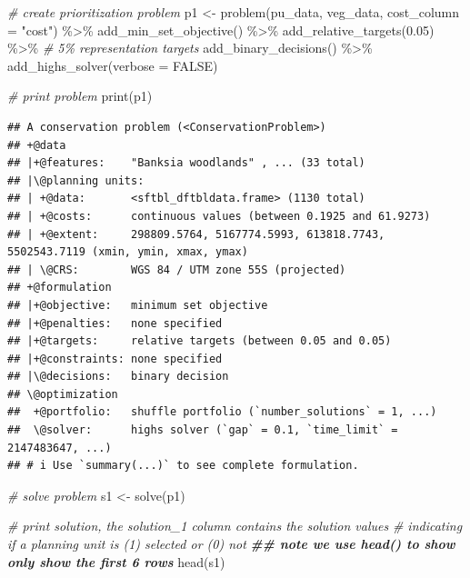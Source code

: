 \documentclass[
  12pt,
]{book}
\newenvironment{Shaded}{\begin{snugshade}}{\end{snugshade}}
\newcommand{\AttributeTok}[1]{\textcolor[rgb]{0.77,0.63,0.00}{#1}}
\newcommand{\CommentTok}[1]{\textcolor[rgb]{0.56,0.35,0.01}{\textit{#1}}}
\newcommand{\ConstantTok}[1]{\textcolor[rgb]{0.00,0.00,0.00}{#1}}
\newcommand{\DocumentationTok}[1]{\textcolor[rgb]{0.56,0.35,0.01}{\textbf{\textit{#1}}}}
\newcommand{\FloatTok}[1]{\textcolor[rgb]{0.00,0.00,0.81}{#1}}
\newcommand{\FunctionTok}[1]{\textcolor[rgb]{0.00,0.00,0.00}{#1}}
\newcommand{\NormalTok}[1]{#1}
\newcommand{\OtherTok}[1]{\textcolor[rgb]{0.56,0.35,0.01}{#1}}
\newcommand{\SpecialCharTok}[1]{\textcolor[rgb]{0.00,0.00,0.00}{#1}}
\newcommand{\StringTok}[1]{\textcolor[rgb]{0.31,0.60,0.02}{#1}}
\begin{document}
\begin{Shaded}
\begin{Highlighting}[]
\CommentTok{\# create prioritization problem}
\NormalTok{p1 }\OtherTok{\textless{}{-}}
  \FunctionTok{problem}\NormalTok{(pu\_data, veg\_data, }\AttributeTok{cost\_column =} \StringTok{"cost"}\NormalTok{) }\SpecialCharTok{\%\textgreater{}\%}
  \FunctionTok{add\_min\_set\_objective}\NormalTok{() }\SpecialCharTok{\%\textgreater{}\%}
  \FunctionTok{add\_relative\_targets}\NormalTok{(}\FloatTok{0.05}\NormalTok{) }\SpecialCharTok{\%\textgreater{}\%} \CommentTok{\# 5\% representation targets}
  \FunctionTok{add\_binary\_decisions}\NormalTok{() }\SpecialCharTok{\%\textgreater{}\%}
  \FunctionTok{add\_highs\_solver}\NormalTok{(}\AttributeTok{verbose =} \ConstantTok{FALSE}\NormalTok{)}

\CommentTok{\# print problem}
\FunctionTok{print}\NormalTok{(p1)}
\end{Highlighting}
\end{Shaded}

\begin{verbatim}
## A conservation problem (<ConservationProblem>)
## +@data
## |+@features:    "Banksia woodlands" , ... (33 total)
## |\@planning units:
## | +@data:       <sftbl_dftbldata.frame> (1130 total)
## | +@costs:      continuous values (between 0.1925 and 61.9273)
## | +@extent:     298809.5764, 5167774.5993, 613818.7743, 5502543.7119 (xmin, ymin, xmax, ymax)
## | \@CRS:        WGS 84 / UTM zone 55S (projected)
## +@formulation
## |+@objective:   minimum set objective
## |+@penalties:   none specified
## |+@targets:     relative targets (between 0.05 and 0.05)
## |+@constraints: none specified
## |\@decisions:   binary decision
## \@optimization
##  +@portfolio:   shuffle portfolio (`number_solutions` = 1, ...)
##  \@solver:      highs solver (`gap` = 0.1, `time_limit` = 2147483647, ...)
## # i Use `summary(...)` to see complete formulation.
\end{verbatim}

\begin{Shaded}
\begin{Highlighting}[]
\CommentTok{\# solve problem}
\NormalTok{s1 }\OtherTok{\textless{}{-}} \FunctionTok{solve}\NormalTok{(p1)}

\CommentTok{\# print solution, the solution\_1 column contains the solution values}
\CommentTok{\# indicating if a planning unit is (1) selected or (0) not}
\DocumentationTok{\#\# note we use head() to show only show the first 6 rows}
\FunctionTok{head}\NormalTok{(s1)}
\end{Highlighting}
\end{Shaded}
\end{document}
